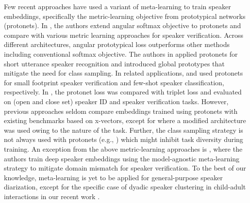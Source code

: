 Few recent approaches have used a variant of meta-learning to train speaker embeddings, specifically the metric-learning objective from prototypical networks (protonets).
In \cite{chung2020defence}, the authors extend angular softmax objective to protonets and compare with various metric learning approaches for speaker verification. Across different architectures, angular prototypical loss outperforms other methods including conventional softmax objective. 
The authors in \cite{kye2020metalearning} applied protonets for short utterance speaker recognition and introduced global prototypes that mitigate the need for class sampling. 
In related applications, \cite{ko_protonets2020} and \cite{an2019shot} used protonets for small footprint speaker verification and few-shot speaker classification, respectively.
In \cite{wang_centroid2019}, the protonet loss was compared with triplet loss and evaluated on (open and close set) speaker ID and speaker verification tasks. 
However, previous approaches seldom compare embeddings trained using protonets with existing benchmarks based on x-vectors, except for \cite{ko_protonets2020} where a modified architecture was used owing to the nature of the task. Further, the class sampling strategy is not always used with protonets (e.g., \cite{chung2020defence,kye2020metalearning})
which might inhibit task diversity during training. 
An exception from the above metric-learning approaches is \cite{kang2020domaininvariant}, where the authors train deep speaker embeddings using the model-agnostic meta-learning strategy to mitigate  domain mismatch for speaker verification.
To the best of our knowledge, meta-learning is yet to be applied for general-purpose speaker diarization, except for the specific case of dyadic speaker clustering in child-adult interactions in our recent work \cite{koluguri2020}. 

